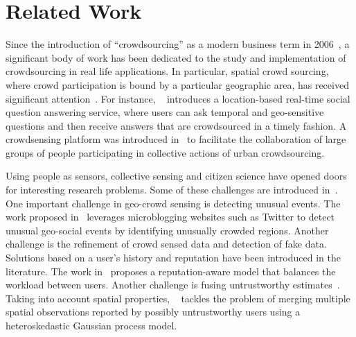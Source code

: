 \documentclass{acm_proc_article-sp}
\begin{document}
\section{Related Work}
Since the introduction of ``crowdsourcing'' as a modern business term in 2006~\cite{howe2006rise}, a significant body of work has been dedicated to the study and implementation of crowdsourcing in real life applications. In particular, spatial crowd sourcing, where crowd participation is bound by a particular geographic area, has received significant attention~\cite{kazemi2012geocrowd, deng2013maximizing, yu2015quality}. For instance, ~\cite{liu2013using} introduces a location-based real-time social question answering service, where users can ask temporal and geo-sensitive questions and then receive answers that are crowdsourced in a timely fashion. A crowdsensing platform was introduced in~\cite{cardone2013fostering} to facilitate the collaboration of large groups of people participating in collective actions of urban crowdsourcing.\par

Using people as sensors, collective sensing and citizen science have opened doors for interesting research problems. Some of these challenges are introduced in~\cite{blaschke2011collective}. One important challenge in geo-crowd sensing is detecting unusual events. The work proposed in~\cite{lee2010measuring} leverages microblogging websites such as Twitter to detect unusual geo-social events by identifying unusually crowded regions. Another challenge is the refinement of crowd sensed data and detection of fake data. Solutions based on a user's history and reputation have been introduced in the literature. The work in~\cite{yu2013reputation} proposes a reputation-aware model that balances the workload between users. Another challenge is fusing untrustworthy estimates~\cite{venanzi2013trust}. Taking into account spatial properties, ~\cite{venanzi2013crowdsourcing} tackles the problem of merging multiple spatial observations reported by possibly untrustworthy users using a heteroskedastic Gaussian process model.\par
\end{document}
